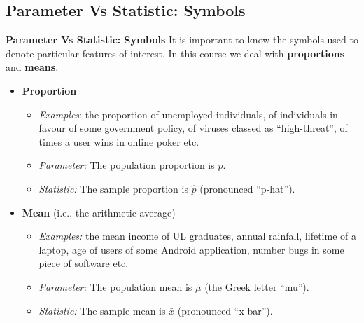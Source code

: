 \documentclass[compress]{beamer}        %
\makeatletter
\newcommand{\tcb}{\textcolor{beamer@blendedblue}}
\makeatother
\begin{document}
\subsection{Parameter Vs Statistic: Symbols}
\begin{frame}{\bf \tcb{Parameter Vs Statistic: Symbols}}
It is important to know the symbols used to denote particular features of interest. In this course we deal with {\bf proportions} and {\bf means}.

\begin{itemize}\itemsep0.4cm
\item {\bf Proportion}
\begin{itemize}\itemsep0.2cm
\item \emph{Examples}: the proportion of unemployed individuals, of individuals in favour of some government policy, of viruses classed as ``high-threat'', of times a user wins in online poker etc.
\item \emph{Parameter:} The population proportion is {\boldmath$p$}.
\item \emph{Statistic:} The sample proportion is {\boldmath$\hat p$} (pronounced ``p-hat'').
\end{itemize}
\item {\bf Mean} (i.e., the arithmetic average)
\begin{itemize}\itemsep0.2cm
\item \emph{Examples:} the mean income of UL graduates, annual rainfall, lifetime of a laptop, age of users of some Android application, number bugs in some piece of software etc.
\item \emph{Parameter:} The population mean is {\boldmath$\mu$} (the Greek letter ``mu'').
\item \emph{Statistic:} The sample mean is {\boldmath$\bar x$} (pronounced ``x-bar'').
\end{itemize}
\end{itemize}

\end{frame}
\end{document}
